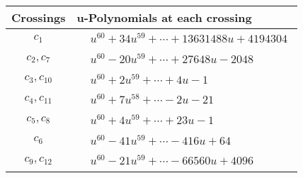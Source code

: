 \documentclass[1p]{elsarticle_modified}
\theoremstyle{definition}
\begin{document}
\begin{tabular}{m{50pt}|m{274pt}}
Crossings & \hspace{64pt}u-Polynomials at each crossing \\
\hline $$\begin{aligned}c_{1}\end{aligned}$$&$\begin{aligned}
&u^{60}+34 u^{59}+\cdots+13631488 u+4194304
\end{aligned}$\\
\hline $$\begin{aligned}c_{2},c_{7}\end{aligned}$$&$\begin{aligned}
&u^{60}-20 u^{59}+\cdots+27648 u-2048
\end{aligned}$\\
\hline $$\begin{aligned}c_{3},c_{10}\end{aligned}$$&$\begin{aligned}
&u^{60}+2 u^{59}+\cdots+4 u-1
\end{aligned}$\\
\hline $$\begin{aligned}c_{4},c_{11}\end{aligned}$$&$\begin{aligned}
&u^{60}+7 u^{58}+\cdots-2 u-21
\end{aligned}$\\
\hline $$\begin{aligned}c_{5},c_{8}\end{aligned}$$&$\begin{aligned}
&u^{60}+4 u^{59}+\cdots+23 u-1
\end{aligned}$\\
\hline $$\begin{aligned}c_{6}\end{aligned}$$&$\begin{aligned}
&u^{60}-41 u^{59}+\cdots-416 u+64
\end{aligned}$\\
\hline $$\begin{aligned}c_{9},c_{12}\end{aligned}$$&$\begin{aligned}
&u^{60}-21 u^{59}+\cdots-66560 u+4096
\end{aligned}$\\
\hline
\end{tabular}\\~\\
\newpage\renewcommand{\arraystretch}{1}
\end{document}
